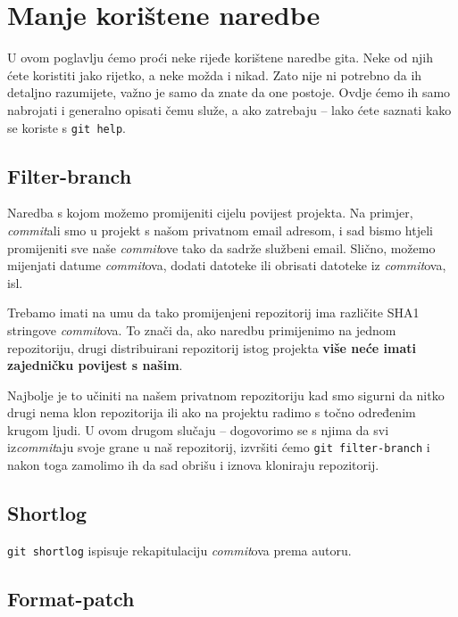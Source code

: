 \chapter*{Manje korištene naredbe}

U ovom poglavlju ćemo proći neke rijeđe korištene naredbe gita.
Neke od njih ćete koristiti jako rijetko, a neke možda i nikad.
Zato nije ni potrebno da ih detaljno razumijete, važno je samo da znate da one postoje. 
Ovdje ćemo ih samo nabrojati i generalno opisati čemu služe, a ako zatrebaju -- lako ćete saznati kako se koriste s \verb+git help+.

\section*{Filter-branch}

Naredba s kojom možemo promijeniti cijelu povijest projekta.
Na primjer, \emph{commit}ali smo u projekt s našom privatnom email adresom, i sad bismo htjeli promijeniti sve naše \emph{commit}ove tako da sadrže službeni email.
Slično, možemo mijenjati datume \emph{commit}ova, dodati datoteke ili obrisati datoteke iz \emph{commit}ova, isl.

Trebamo imati na umu da tako promijenjeni repozitorij ima različite SHA1 stringove \emph{commit}ova.
To znači da, ako naredbu primijenimo na jednom repozitoriju, drugi distribuirani repozitorij istog projekta \textbf{više neće imati zajedničku povijest s našim}.

Najbolje je to učiniti na našem privatnom repozitoriju kad smo sigurni da nitko drugi nema klon repozitorija ili ako na projektu radimo s točno određenim krugom ljudi.
U ovom drugom slučaju -- dogovorimo se s njima da svi iz\emph{commit}aju svoje grane u naš repozitorij, izvršiti ćemo \verb+git filter-branch+ i nakon toga zamolimo ih da sad obrišu i iznova kloniraju repozitorij.

\section*{Shortlog}

\verb+git shortlog+ ispisuje rekapitulaciju \emph{commit}ova prema autoru.

\section*{Format-patch}

